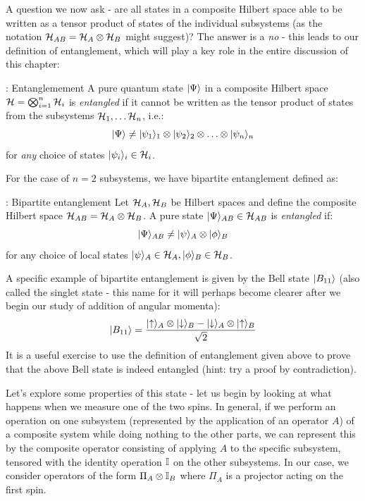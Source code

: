 A question we now ask - are all states in a composite Hilbert space able to be written as a tensor product of states of the individual subsystems (as the notation $\mathcal{H}_{AB} = \mathcal{H}_A \otimes \mathcal{H}_B$ might suggest)? The answer is a \emph{no} - this leads to our definition of entanglement, which will play a key role in the entire discussion of this chapter:

\begin{defbox}{: Entanglemement}
    A pure quantum state $\lvert \Psi \rangle$ in a composite Hilbert space $\mathcal{H} = \bigotimes_{i=1}^n \mathcal{H}_i$ is \emph{entangled} if it cannot be written as the tensor product of states from the subsystems $\mathcal{H}_1, \ldots \mathcal{H}_n$, i.e.:
    \begin{equation}
        \lvert \Psi \rangle \neq \lvert \psi_1 \rangle_1 \otimes \lvert \psi_2 \rangle_2 \otimes \ldots \otimes \lvert \psi_n \rangle_n
    \end{equation}
    for \emph{any} choice of states $\lvert \psi_i \rangle_i \in \mathcal{H}_i$. 
\end{defbox}

For the case of $n = 2$ subsystems, we have bipartite entanglement defined as:

\begin{defbox}{: Bipartite entanglement}
    Let $\mathcal{H}_A, \mathcal{H}_B$ be Hilbert spaces and define the composite Hilbert space $\mathcal{H}_{AB} = \mathcal{H}_A \otimes \mathcal{H}_B$. A pure state $\lvert \Psi \rangle_{AB} \in \mathcal{H}_{AB}$ is \emph{entangled} if:
    \begin{equation}
        \ket{\Psi}_{AB} \neq \ket{\psi}_A \otimes \ket{\phi}_B
    \end{equation}
    for any choice of local states $\ket{\psi}_A \in \H_A, \ket{\phi}_B \in \H_B$. 
\end{defbox}

A specific example of bipartite entanglement is given by the Bell state $\lvert B_{11} \rangle$ (also called the singlet state - this name for it will perhaps become clearer after we begin our study of addition of angular momenta):
\begin{equation}
    \lvert B_{11} \rangle = \frac{\lvert \uparrow \rangle_A \otimes \lvert \downarrow \rangle_B - \lvert \downarrow \rangle_A \otimes \lvert \uparrow \rangle_B}{\sqrt{2}}
\end{equation}
It is a useful exercise to use the definition of entanglement given above to prove that the above Bell state is indeed entangled (hint: try a proof by contradiction).

Let's explore some properties of this state - let us begin by looking at what happens when we measure one of the two spins. In general, if we perform an operation on one subsystem (represented by the application of an operator $A$) of a composite system while doing nothing to the other parts, we can represent this by the composite operator consisting of applying $A$ to the specific subsystem, tensored with the identity operation $\mathbb{I}$ on the other subsystems. In our case, we consider operators of the form $\Pi_A \otimes \mathbb{I}_B$ where $\Pi_A$ is a projector acting on the first spin.

